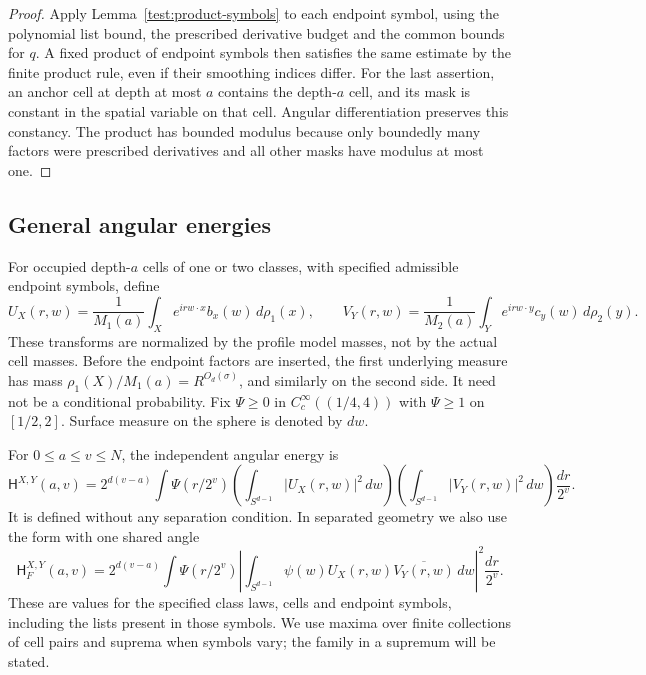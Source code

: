 \begin{proof}
Apply Lemma~\ref{test:product-symbols} to each endpoint symbol, using
the polynomial list bound, the prescribed derivative budget and the common
bounds for $q$.  A fixed product of endpoint symbols then satisfies the
same estimate by the finite product rule, even if their smoothing indices
differ.  For the last
assertion, an anchor cell at depth at most $a$ contains the depth-$a$
cell, and its mask is constant in the spatial variable on that cell.
Angular differentiation preserves this constancy.  The product has
bounded modulus because only boundedly many factors were prescribed
derivatives and all other masks have modulus at most one.
\end{proof}

\subsection{General angular energies}

For occupied depth-$a$ cells of one or two classes, with specified
admissible endpoint symbols, define
\begin{equation}\label{osc:transforms}
 U_X(r,w)=\frac1{M_1(a)}\int_X e^{irw\cdot x}b_x(w)\,d\rho_1(x),
 \qquad
 V_Y(r,w)=\frac1{M_2(a)}\int_Y e^{irw\cdot y}c_y(w)\,d\rho_2(y).
\end{equation}
These transforms are normalized by the profile model masses, not by the
actual cell masses.  Before the endpoint factors are inserted, the first
underlying measure has mass $\rho_1(X)/M_1(a)=R^{O_d(\sigma)}$, and
similarly on the second side.  It need not be a conditional probability.
Fix $\Psi\ge0$ in $C_c^\infty((1/4,4))$ with $\Psi\ge1$ on $[1/2,2]$.
Surface measure on the sphere is denoted by $dw$.

\begin{definition}\label{osc:states}
For $0\le a\le v\le N$, the independent angular energy is
\begin{equation}\label{osc:H}
 \mathsf H^{X,Y}(a,v)
 =2^{d(v-a)}\int\Psi(r/2^v)
   \left(\int_{S^{d-1}}|U_X(r,w)|^2\,dw\right)
   \left(\int_{S^{d-1}}|V_Y(r,w)|^2\,dw\right)
   \frac{dr}{2^v}.
\end{equation}
It is defined without any separation condition.  In separated geometry
we also use the form with one shared angle
\begin{equation}\label{osc:HF}
 \mathsf H_F^{X,Y}(a,v)
 =2^{d(v-a)}\int\Psi(r/2^v)
   \left|\int_{S^{d-1}}\psi(w)
           U_X(r,w)\overline{V_Y(r,w)}\,dw\right|^2
   \frac{dr}{2^v}.
\end{equation}
These are values for the specified class laws, cells and endpoint
symbols, including the lists present in those symbols.  We use maxima over
finite collections of cell pairs and suprema when symbols vary; the family
in a supremum will be stated.
\end{definition}

